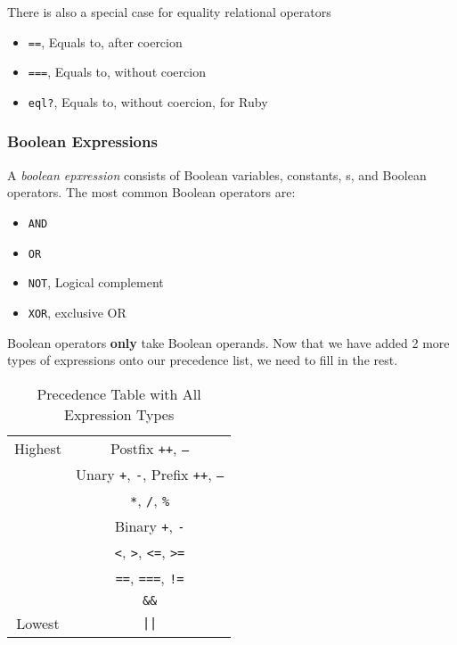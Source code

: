 There is also a special case for equality relational operators
\begin{itemize}[noitemsep]
\item \texttt{==}, Equals to, after  coercion
\item \texttt{===}, Equals to, without  coercion
\item \texttt{eql?}, Equals to, without  coercion, for Ruby
\end{itemize}

\subsubsection{Boolean Expressions}\label{subsubsec:Boolean_Expressions}
\begin{definition}\label{def:Boolean_Expression}
  A \emph{boolean epxression} consists of Boolean variables, constants, s, and Boolean operators.
  The most common Boolean operators are:
  \begin{itemize}[noitemsep]
  \item \texttt{AND}
  \item \texttt{OR}
  \item \texttt{NOT}, Logical complement
  \item \texttt{XOR}, exclusive OR
  \end{itemize}
\end{definition}

Boolean operators \textbf{only} take Boolean operands.
Now that we have added 2 more types of expressions onto our precedence list, we need to fill in the rest.

\begin{table}[h!]
  \centering
  \begin{tabular}{cc}
    \toprule
    Highest & Postfix \texttt{++}, \texttt{--} \\
            & Unary \texttt{+}, \texttt{-}, Prefix \texttt{++}, \texttt{--} \\
            & \texttt{*}, \texttt{/}, \texttt{\%} \\
            & Binary \texttt{+}, \texttt{-} \\
            & \texttt{<}, \texttt{>}, \texttt{<=}, \texttt{>=} \\
            & \texttt{==}, \texttt{===}, \texttt{!=} \\
            & \texttt{\&\&} \\
    Lowest & \texttt{||} \\
    \bottomrule
  \end{tabular}
  \caption{Precedence Table with All Expression Types}
  \label{tab:Precedence_Table_with_All_Expression_Types}
\end{table}

